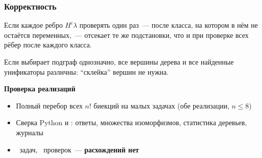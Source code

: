 \documentclass[aspectratio=169]{beamer}
\begin{document}
\begin{frame}
  \frametitle{Корректность}
  \begin{rulemma}
    Если каждое ребро $H^i\lambda$ проверять один раз~--- после класса, на котором в нём не остаётся переменных,~--- \ISOMm{} отсекает те же подстановки, что и при проверке всех рёбер после каждого класса.
  \end{rulemma}
  \begin{rulemma}
    Если  выбирает подграф однозначно, все вершины дерева \ISOMn{} и все найденные унификаторы различны: \enquote{склейка} вершин не нужна.
  \end{rulemma}
  \textbf{Проверка реализаций}
  \begin{itemize}
    \item Полный перебор всех $n!$ биекций на малых задачах (обе реализации, $n \le 8$)
    \item Сверка Python и \Cpp{}: ответы, множества изоморфизмов, статистика деревьев, журналы
    \item \NCases{}~задач, \NChecks{}~проверок~--- \textbf{расхождений нет}
  \end{itemize}
\end{frame}
\end{document}
